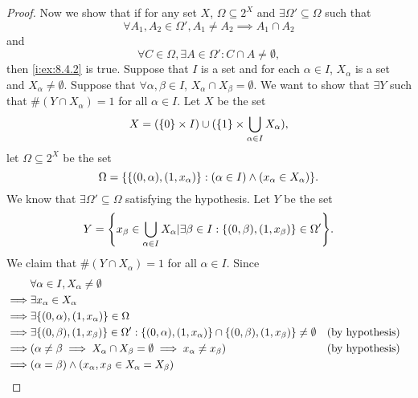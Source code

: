 \begin{proof}
  Now we show that if for any set \(X\), \(\Omega \subseteq 2^X\) and \(\exists \Omega' \subseteq \Omega\) such that
  \[
    \forall A_1, A_2 \in \Omega', A_1 \neq A_2 \implies A_1 \cap A_2
  \]
  and
  \[
    \forall C \in \Omega, \exists A \in \Omega' : C \cap A \neq \emptyset,
  \]
  then \cref{i:ex:8.4.2} is true.
  Suppose that \(I\) is a set and for each \(\alpha \in I\), \(X_{\alpha}\) is a set and \(X_{\alpha} \neq \emptyset\).
  Suppose that \(\forall \alpha, \beta \in I\), \(X_{\alpha} \cap X_{\beta} = \emptyset\).
  We want to show that \(\exists Y\) such that \(\#(Y \cap X_{\alpha}) = 1\) for all \(\alpha \in I\).
  Let \(X\) be the set
  \[
    X = (\left\lbrace0\right\rbrace \times I) \cup (\left\lbrace1\right\rbrace \times \bigcup_{\alpha \in I} X_{\alpha}),
  \]
  let \(\Omega \subseteq 2^X\) be the set
  \[
    \Omega = \set{\set{(0, \alpha), (1, x_{\alpha})} : (\alpha \in I) \land (x_{\alpha} \in X_{\alpha})}.
  \]
  We know that \(\exists \Omega' \subseteq \Omega\) satisfying the hypothesis.
  Let \(Y\) be the set
  \[
    Y = \set{x_{\beta} \in \bigcup_{\alpha \in I} X_{\alpha} | \exists \beta \in I : \set{(0, \beta), (1, x_{\beta})} \in \Omega'}.
  \]
  We claim that \(\#(Y \cap X_{\alpha}) = 1\) for all \(\alpha \in I\).
  Since
  \begin{align*}
             & \forall \alpha \in I, X_{\alpha} \neq \emptyset                                                                                                                            \\
    \implies & \exists x_{\alpha} \in X_{\alpha}                                                                                                                                          \\
    \implies & \exists \set{(0, \alpha), (1, x_{\alpha})} \in \Omega                                                                                                                      \\
    \implies & \exists \set{(0, \beta), (1, x_{\beta})} \in \Omega' : \set{(0, \alpha), (1, x_{\alpha})} \cap \set{(0, \beta), (1, x_{\beta})} \neq \emptyset &  & \text{(by hypothesis)} \\
    \implies & (\alpha \neq \beta \implies X_{\alpha} \cap X_{\beta} = \emptyset \implies x_{\alpha} \neq x_{\beta})                                          &  & \text{(by hypothesis)} \\
    \implies & (\alpha = \beta) \land (x_{\alpha}, x_{\beta} \in X_{\alpha} = X_{\beta})                                                                                                  \\

\end{align*}
\end{proof}
